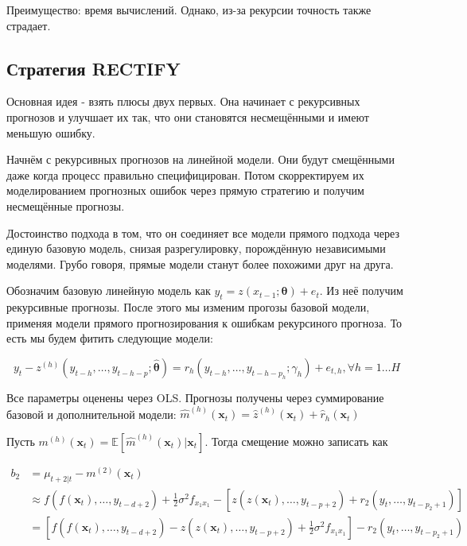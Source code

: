 \documentclass[a4paper,12pt]{article}
\begin{document}
Преимущество: время вычислений. Однако, из-за рекурсии точность также страдает.
\subsection{Стратегия RECTIFY}

Основная идея - взять плюсы двух первых. Она начинает с рекурсивных прогнозов и улучшает их так, что они становятся несмещёнными и имеют меньшую ошибку.

Начнём с рекурсивных прогнозов на линейной модели. Они будут смещёнными даже когда процесс правильно специфицирован. Потом скорректируем их моделированием прогнозных ошибок через прямую стратегию и получим несмещённые прогнозы.

Достоинство подхода в том, что он соединяет все модели прямого подхода через единую базовую модель, снизая разрегулировку, порождённую независимыми моделями. Грубо говоря, прямые модели станут более похожими друг на друга.

Обозначим базовую линейную модель как $ y_{t}=z\left(x_{t-1} ; \boldsymbol{\theta}\right)+e_{t} $. Из неё получим рекурсивные прогнозы. После этого мы изменим прогозы базовой модели, применяя модели прямого прогнозирования к ошибкам рекурсиного прогноза. То есть мы будем фитить следующие модели:

\[ y_{t}-z^{(h)}\left(y_{t-h}, \ldots, y_{t-h-p} ; \hat{\boldsymbol{\theta}}\right)=r_{h}\left(y_{t-h}, \ldots, y_{t-h-p_{h}} ; \gamma_{h}\right)+e_{t, h},  	 \forall h = 1 \ldots H \]

Все параметры оценены через OLS. Прогнозы получены через суммирование базовой и дополнительной модели: $ \hat{m}^{(h)}\left(\boldsymbol{x}_{t}\right)=\hat{z}^{(h)}\left(\boldsymbol{x}_{t}\right)+\hat{r}_{h}\left(\boldsymbol{x}_{t}\right) $ 

Пусть $ m^{(h)}\left(\boldsymbol{x}_{t}\right)=\mathbb{E}\left[\hat{m}^{(h)}\left(\boldsymbol{x}_{t}\right) | \boldsymbol{x}_{t}\right] $. Тогда смещение можно записать как 

\[ \begin{aligned} b_{2} &=\mu_{t+2 | t}-m^{(2)}\left(\boldsymbol{x}_{t}\right) \\ & \approx f\left(f\left(\boldsymbol{x}_{t}\right), \ldots, y_{t-d+2}\right)+\frac{1}{2} \sigma^{2} f_{x_{1} x_{1}}-\left[z\left(z\left(\boldsymbol{x}_{t}\right), \ldots, y_{t-p+2}\right)+r_{2}\left(y_{t}, \ldots, y_{t-p_{2}+1}\right)\right] \\ &=\left[f\left(f\left(\boldsymbol{x}_{t}\right), \ldots, y_{t-d+2}\right)-z\left(z\left(\boldsymbol{x}_{t}\right), \ldots, y_{t-p+2}\right)+\frac{1}{2} \sigma^{2} f_{x_{1} x_{1}}\right]-r_{2}\left(y_{t}, \ldots, y_{t-p_{2}+1}\right) \end{aligned} \]
\end{document}
